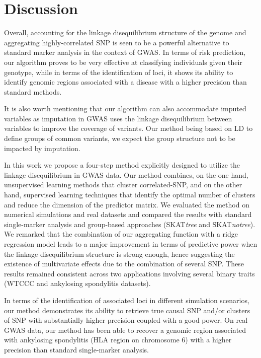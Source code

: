 \documentclass[]{book}
\begin{document}
\hypertarget{discussions}{%
\section{Discussion}\label{discussions}}

Overall, accounting for the linkage disequilibrium structure of the
genome and aggregating highly-correlated SNP is seen to be a powerful
alternative to standard marker analysis in the context of GWAS. In terms
of risk prediction, our algorithm proves to be very effective at
classifying individuals given their genotype, while in terms of the
identification of loci, it shows its ability to identify genomic regions
associated with a disease with a higher precision than standard methods.

It is also worth mentioning that our algorithm can also accommodate
imputed variables as imputation in GWAS uses the linkage disequilibrium
between variables to improve the coverage of variants. Our method being
based on LD to define groups of common variants, we expect the group
structure not to be impacted by imputation.

In this work we propose a four-step method explicitly designed to
utilize the linkage disequilibrium in GWAS data. Our method combines, on
the one hand, unsupervised learning methods that cluster correlated-SNP,
and on the other hand, supervised learning techniques that identify the
optimal number of clusters and reduce the dimension of the predictor
matrix. We evaluated the method on numerical simulations and real
datasets and compared the results with standard single-marker analysis
and group-based approaches (SKAT\emph{tree} and SKAT\emph{notree}). We remarked
that the combination of our aggregating function with a ridge regression
model leads to a major improvement in terms of predictive power when the
linkage disequilibrium structure is strong enough, hence suggesting the
existence of multivariate effects due to the combination of several SNP.
These results remained consistent across two applications involving
several binary traits (WTCCC and ankylosing spondylitis datasets).

In terms of the identification of associated loci in different
simulation scenarios, our method demonstrates its ability to retrieve
true causal SNP and/or clusters of SNP with substantially higher
precision coupled with a good power. On real GWAS data, our method has
been able to recover a genomic region associated with ankylosing
spondylitis (HLA region on chromosome 6) with a higher precision than
standard single-marker analysis.
\end{document}
